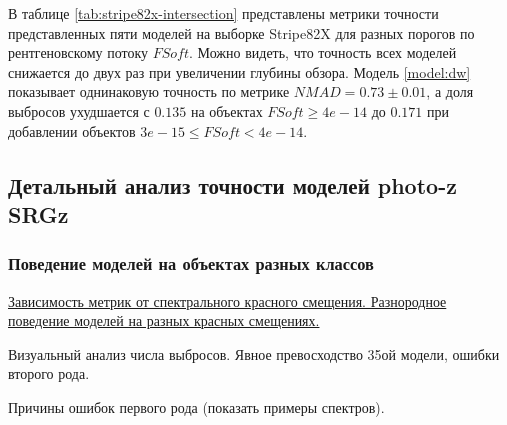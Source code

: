 \documentclass[fleqn,usenatbib]{mnras}
\begin{document}
В таблице \ref{tab:stripe82x-intersection} представлены метрики точности представленных пяти моделей на выборке Stripe82X для разных порогов по рентгеновскому потоку $FSoft$. Можно видеть, что точность всех моделей снижается до двух раз при увеличении глубины обзора. Модель \ref{model:dw} показывает однинаковую точность по метрике $NMAD = 0.73 \pm 0.01$, а доля выбросов ухудшается с $0.135$ на объектах $FSoft \geq 4e-14$ до $0.171$ при добавлении объектов $3e-15 \leq FSoft < 4e-14$.

\clearpage

\subsection{Детальный анализ точности моделей photo-z SRGz}

\subsubsection{Поведение моделей на объектах разных классов}

\underline{Зависимость метрик от спектрального красного смещения. Разнородное поведение моделей на разных красных смещениях.}

Визуальный анализ числа выбросов. Явное превосходство 35ой модели, ошибки второго рода.

Причины ошибок первого рода (показать примеры спектров).
\end{document}
